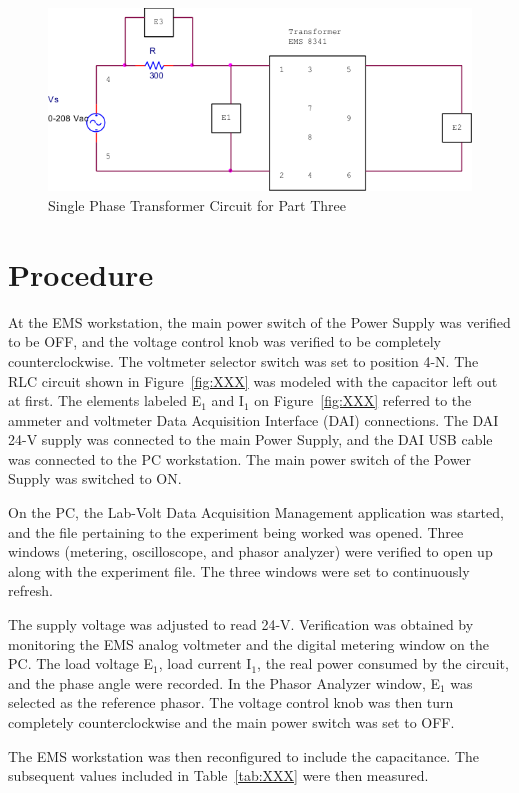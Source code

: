 \documentclass{article}
\begin{document}
\begin{figure}[h]
  \centering
  \includegraphics[width=.8\textwidth]{circuit_03}
  \caption{Single Phase Transformer Circuit for Part Three}
  \label{fig:circuit_03}
\end{figure}

\section{Procedure}
At the EMS workstation, the main power switch of the Power Supply was verified
to be OFF, and the voltage control knob was verified to be completely
counterclockwise. The voltmeter selector switch was set to position 4-N. The
RLC circuit shown in Figure~\ref{fig:XXX} was modeled with the capacitor
left out at first. The elements labeled E$_1$ and I$_1$ on
Figure~\ref{fig:XXX} referred to the ammeter and voltmeter Data Acquisition
Interface (DAI) connections. The DAI 24-V supply was connected to the main
Power Supply, and the DAI USB cable was connected to the PC workstation. The
main power switch of the Power Supply was switched to ON.

On the PC, the Lab-Volt Data Acquisition Management application was started,
and the file pertaining to the experiment being worked was opened. Three
windows (metering, oscilloscope, and phasor analyzer) were verified to open up
along with the experiment file. The three windows were set to continuously
refresh.

The supply voltage was adjusted to read 24-V. Verification was obtained by
monitoring the EMS analog voltmeter and the digital metering window on the {PC}.
The load voltage E$_1$, load current I$_1$, the real power consumed by the
circuit, and the phase angle were recorded. In the Phasor Analyzer window,
E$_1$ was selected as the reference phasor. The voltage control knob was then
turn completely counterclockwise and the main power switch was set to OFF.

The EMS workstation was then reconfigured to include the capacitance.  The
subsequent values included in Table~\ref{tab:XXX} were then measured.
\end{document}
